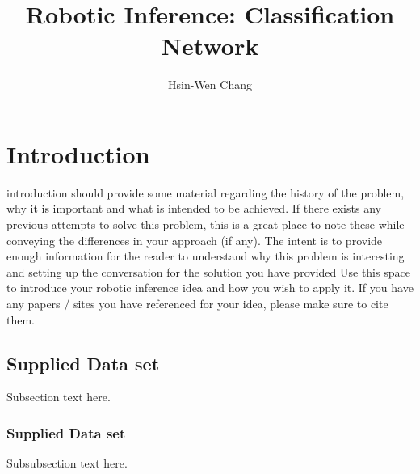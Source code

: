 \documentclass[10pt,journal,compsoc]{IEEEtran}
\begin{document}
\title{Robotic Inference: Classification Network}

\author{Hsin-Wen Chang}

%
{}


\maketitle
\IEEEdisplaynontitleabstractindextext
\IEEEpeerreviewmaketitle
\section{Introduction}
\label{sec:introduction}

 introduction should provide some material regarding the history of the problem, why it is important and what is intended to be achieved. If there exists any previous attempts to solve this problem, this is a great place to note these while conveying the differences in your approach (if any). The intent is to provide enough information for the reader to understand why this problem is interesting and setting up the conversation for the solution you have provided
Use this space to introduce your robotic inference idea and how you wish to apply it. 
If you have any papers / sites you have referenced for your idea, please make sure to cite them.

\subsection{Supplied Data set}
Subsection text here.

\subsubsection{Supplied Data set}
Subsubsection text here.
\end{document}
